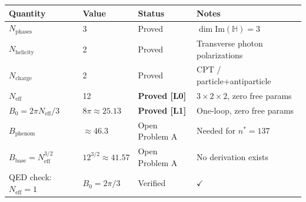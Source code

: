 \documentclass[12pt,a4paper]{article}
\theoremstyle{definition}
\theoremstyle{remark}
\renewcommand{\H}{\mathbb{H}}
\newcommand{\Neff}{N_{\mathrm{eff}}}
\begin{document}
\begin{center}
\begin{tabular}{lllp{4cm}}
  \toprule
  \textbf{Quantity} & \textbf{Value} & \textbf{Status} & \textbf{Notes} \\
  \midrule
  $N_\mathrm{phases}$ & 3 & \textcolor{provengreen}{Proved} & $\dim\mathrm{Im}(\H)=3$ \\
  $N_\mathrm{helicity}$ & 2 & \textcolor{provengreen}{Proved} & Transverse photon polarizations \\
  $N_\mathrm{charge}$ & 2 & \textcolor{provengreen}{Proved} & CPT / particle+antiparticle \\
  $\Neff$ & 12 & \textcolor{provengreen}{\textbf{Proved [L0]}} & $3 \times 2 \times 2$, zero free params \\
  $B_0 = 2\pi\Neff/3$ & $8\pi \approx 25.13$ & \textcolor{provengreen}{\textbf{Proved [L1]}} & One-loop, zero free params \\
  $B_\mathrm{phenom}$ & $\approx 46.3$ & \textcolor{openred}{Open Problem A} & Needed for $n^*=137$ \\
  $B_\mathrm{base} = \Neff^{3/2}$ & $12^{3/2} \approx 41.57$ & \textcolor{openred}{Open Problem A} & No derivation exists \\
  \midrule
  QED check: $\Neff=1$ & $B_0 = 2\pi/3$ & \textcolor{provengreen}{Verified} & $\checkmark$ \\
  \bottomrule
\end{tabular}
\end{center}
\end{document}
